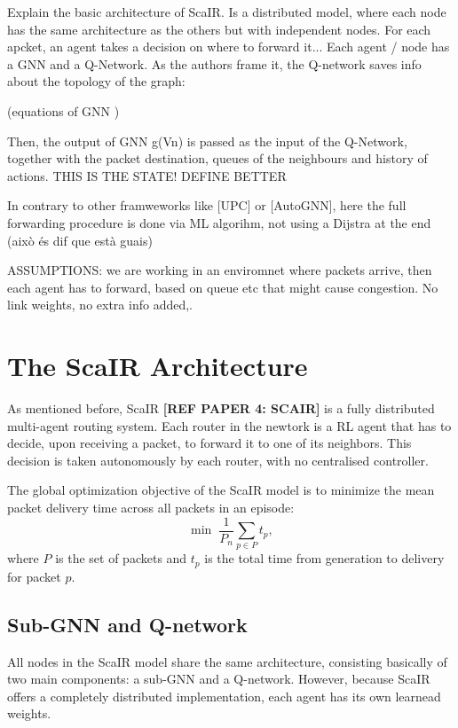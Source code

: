 \documentclass[10pt,twocolumn,letterpaper]{article}
\begin{document}
Explain the basic architecture of ScaIR. Is a distributed model, where each node has the same architecture as the others but with independent nodes. For each apcket, an agent takes a decision on where to forward it...
Each agent / node has a GNN and a Q-Network. As the authors frame it, the Q-network saves info about the topology of the graph:

(equations of GNN )

Then, the output of GNN g(Vn) is passed as the input of the Q-Network, together with the packet destination, queues of the neighbours and history of actions. THIS IS THE STATE! DEFINE BETTER

In contrary to other framweworks like [UPC] or [AutoGNN], here the full forwarding procedure is done via ML algorihm, not using a Dijstra at the end (això és dif que està guais)

ASSUMPTIONS: we are working in an enviromnet where packets arrive, then each agent has to forward, based on queue etc that might cause congestion. No link weights, no extra info added,.

\section{The ScaIR Architecture}
\label{sec:arch}

As mentioned before, ScaIR \textbf{[REF PAPER 4: SCAIR]} is a fully distributed multi-agent routing
system. Each router in the newtork is a RL agent that has to decide, upon receiving a packet, to forward it to one of its neighbors. This decision is taken autonomously by each router, with no centralised controller.

The global optimization objective of the ScaIR model is to minimize the mean
packet delivery time across all packets in an episode:
\begin{equation}
  \min \;\frac{1}{P_n}\sum_{p \in P} t_p,
  \label{eq:obj}
\end{equation}
where $P$ is the set of packets and $t_p$ is the total time from
generation to delivery for packet $p$.

\subsection{Sub-GNN and Q-network}

All nodes in the ScaIR model share the same architecture, consisting basically of two main components:  a sub-GNN and a Q-network. However, because ScaIR offers a completely distributed implementation, each agent has its own learnead weights.
\end{document}
